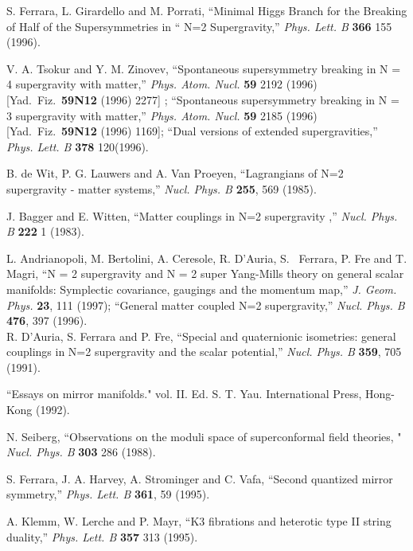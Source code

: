 \documentclass[a4paper,12pt]{article}
\begin{document}
\begin{thebibliography}{99}
 S. Ferrara, L. Girardello and M. Porrati,
``Minimal Higgs Branch for the Breaking of Half of the
Supersymmetries in `` N=2 Supergravity,'' {\it Phys.  Lett.  B}
{\bf 366} 155 (1996).



 V. A. Tsokur and Y. M. Zinovev,
``Spontaneous supersymmetry breaking in N = 4 supergravity with
matter,'' {\it Phys.  Atom.  Nucl.} {\bf 59} 2192 (1996) [Yad.\
Fiz.\ {\bf 59N12} (1996) 2277] ; ``Spontaneous supersymmetry
breaking in N = 3 supergravity with matter,'' {\it Phys.  Atom.
Nucl.} {\bf 59} 2185 (1996) [Yad.\ Fiz.\ {\bf 59N12} (1996) 1169];
``Dual versions of extended supergravities,'' {\it Phys.  Lett. B}
{\bf 378} 120(1996).


B. de Wit, P. G. Lauwers and A. Van Proeyen, ``Lagrangians of N=2
supergravity - matter systems,'' {\it Nucl. Phys. B} {\bf 255},
569 (1985).

J. Bagger and E. Witten, ``Matter couplings in N=2 supergravity
,'' {\it Nucl. Phys. B} {\bf 222} 1 (1983).







L. Andrianopoli, M. Bertolini, A. Ceresole, R. D'Auria, S.~
Ferrara, P. Fre and T. Magri, ``N = 2 supergravity and N = 2 super
Yang-Mills theory on general scalar  manifolds: Symplectic
covariance, gaugings and the momentum map,'' {\it J.  Geom. Phys.}
{\bf 23}, 111 (1997); ``General matter coupled N=2 supergravity,''
{\it Nucl. Phys. B} {\bf 476}, 397 (1996).\\
R. D'Auria, S. Ferrara and P. Fre, ``Special and quaternionic
isometries: general couplings in N=2 supergravity and the scalar
potential,'' {\it Nucl.  Phys. B} {\bf 359}, 705 (1991).


 ``Essays on mirror manifolds." vol.  II. Ed. S. T. Yau.
International Press, Hong-Kong
(1992).

 N. Seiberg, ``Observations on the moduli space of
superconformal field theories, " {\it Nucl. Phys. B} {\bf 303} 286
(1988).

S. Ferrara, J. A. Harvey, A. Strominger and C. Vafa, ``Second
quantized mirror symmetry,'' {\it Phys. Lett. B} {\bf 361}, 59
(1995).

A. Klemm, W. Lerche and P. Mayr, ``K3 fibrations and heterotic
type II string duality,'' {\it Phys. Lett. B} {\bf 357} 313
(1995).




\end{thebibliography}
\end{document}
